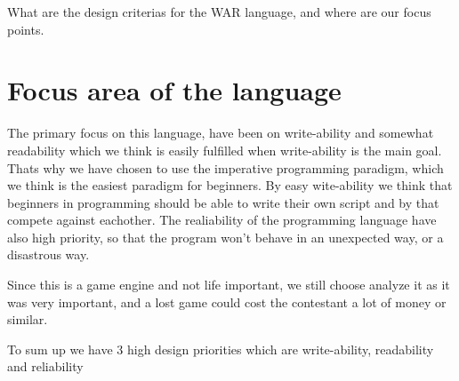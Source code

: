 What are the design criterias for the WAR language, and where are our focus points.

\section{Focus area of the language}

The primary focus on this language, have been on write-ability and somewhat readability which we think is easily fulfilled when write-ability is the main goal. Thats why we have chosen to use the imperative programming paradigm, which we think is the easiest paradigm for beginners. By easy wite-ability we think that beginners in programming should be able to write their own script and by that compete against eachother. The realiability of the programming language have also high priority, so that the program won't behave in an unexpected way, or a disastrous way.

 
Since this is a game engine and not life important, we still choose analyze it as it was very important, and a lost game could cost the contestant a lot of money or similar.

To sum up we have 3 high design priorities which are write-ability, readability and reliability